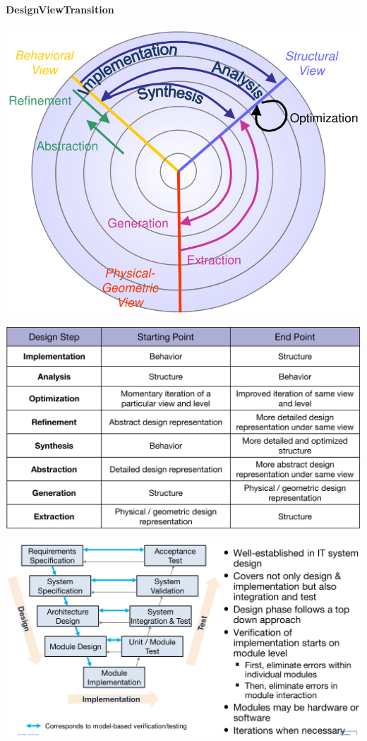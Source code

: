 \documentclass[english]{latex4ei/latex4ei_sheet}
\begin{document}
\paragraph{DesignViewTransition}
\begin{center}
  \includegraphics[width=0.7\linewidth]{assets/DesignViewTransitions.png}
\end{center}

\begin{center}
  \includegraphics[width=0.8\linewidth]{assets/DesignViewTransitionTable.png}
\end{center}

\begin{center}
  \includegraphics[width=0.8\linewidth]{assets/VModel.png}
\end{center}
\end{document}
